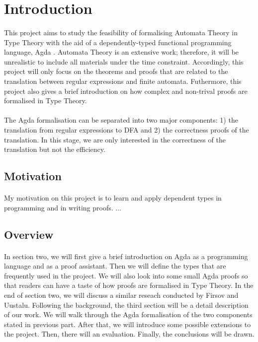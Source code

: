 \documentclass[twoside,openright,final]{bhamthesis}
\begin{document}
\section{Introduction}
\paragraph{} This project aims to study the feasibility of formalising
Automata Theory \cite{aho1972} in Type Theory with the aid of a dependently-typed
functional programming language, Agda \cite{agdawiki2016}. Automata
Theory is an extensive work; therefore, it will be unrealistic to include all
materials under the time constraint. Accordingly, this project will only focus on the theorems and
proofs that are related to the translation between regular expressions
and finite automata. Futhermore, this project also gives a brief introduction
on how complex and non-trival proofs are formalised in Type Theory. 

\paragraph{} The Agda formalisation can be separated into two major
components: 1) the translation from regular expressions to DFA and 2)
the correctness proofs of the translation. In this stage, we are only
interested in the correctness of the translation but not the efficiency. 

\subsection{Motivation}
\paragraph{} My motivation on this project is to learn and apply
dependent types in programming and in writing proofs. ...


\subsection{Overview}
\paragraph{} In section two, we will first give a brief introduction on
Agda as a programming language and as a proof assistant. Then we will
define the types that are frequently used in the project. We
will also look into some small Agda proofs so that readers can
have a taste of how proofs are formalised in Type Theory. In the end
of section two, we will discuss a similar reseach \cite{firsov2013}
conducted by Firsov and Uustalu. Following the
background, the third section will be a detail description of our
work. We will walk through the Agda
formalisation of the two components stated in previous part. After
that, we will introduce some possible extensions to the project. Then,
there will an evaluation. Finally, the conclusions will be drawn. 
\end{document}
